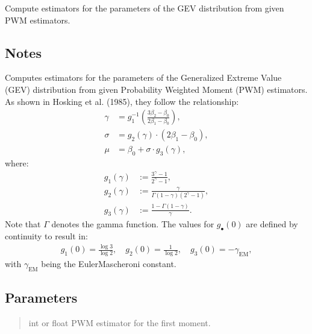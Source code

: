 \documentclass[a4paper,11pt,openany,english]{sphinxmanual}
\begin{document}
\begin{fulllineitems}
\label{\detokenize{api_misc:xtremes.miscellaneous.PWM2GEV}}
\pysigstartsignatures
{}
\pysigstopsignatures
\sphinxAtStartPar
Compute estimators for the parameters of the GEV distribution from given PWM estimators.


\subsection{Notes}
\label{\detokenize{api_misc:id26}}
\sphinxAtStartPar
Computes estimators for the parameters of the Generalized Extreme Value (GEV) distribution from given Probability 
Weighted Moment (PWM) estimators. As shown in Hosking et al. (1985), they follow the relationship:
\begin{equation*}
\begin{split}\gamma &= g_1^{-1}\left(\frac{3\beta_2-\beta_0}{2\beta_1-\beta_0}\right), \\
\sigma &= g_2(\gamma)\cdot (2\beta_1-\beta_0), \\
\mu &= \beta_0+\sigma\cdot g_3(\gamma),\end{split}
\end{equation*}
\sphinxAtStartPar
where:
\begin{equation*}
\begin{split}g_1(\gamma) &:= \frac{3^\gamma-1}{2^\gamma-1}, \\
g_2(\gamma) &:= \frac{\gamma}{\Gamma(1-\gamma)(2^\gamma-1)}, \\
g_3(\gamma) &:= \frac{1-\Gamma(1-\gamma)}{\gamma}.\end{split}
\end{equation*}
\sphinxAtStartPar
Note that \(\Gamma\) denotes the gamma function. The values for \(g_\bullet(0)\) 
are defined by continuity to result in:
\begin{equation*}
\begin{split}g_1(0)= \frac{\log 3}{\log 2}, \quad g_2(0) = \frac{1}{\log 2}, \quad g_3(0) = -\gamma_\mathrm{EM},\end{split}
\end{equation*}
\sphinxAtStartPar
with \(\gamma_\mathrm{EM}\) being the Euler\sphinxhyphen{}Mascheroni constant.


\subsection{Parameters}
\label{\detokenize{api_misc:id27}}\begin{quote}\begin{description}
\sphinxAtStartPar
int or float
PWM estimator for the first moment.


\end{description}
\end{quote}
\end{fulllineitems}
\end{document}
